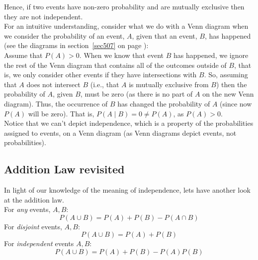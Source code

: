\noindent Hence, if two events have non-zero probability and are mutually exclusive then they are not independent. \\

\noindent For an intuitive understanding, consider what we do with a Venn diagram when we consider the probability of an event, $A$, given that an event, $B$, has happened (see the diagrams in section~\ref{sec507} on page \pageref{sec507}): \\

\noindent Assume that $P(A) > 0$. When we know that event $B$ has happened, we ignore the rest of the Venn diagram that contains all of the outcomes outside of $B$, that is, we only consider other events if they have intersections with $B$. So, assuming that $A$ does not intersect $B$ (i.e., that $A$ is mutually exclusive from $B$) then the probability of $A$, given $B$, must be zero (as there is no part of $A$ on the new Venn diagram). Thus, the occurrence of $B$ has changed the probability of $A$ (since now $P(A)$ will be zero). That is, $P(A \! \mid \! B) = 0 \neq P(A)$, as $P(A) > 0$. \\

\noindent Notice that we can't depict independence, which is a property of the probabilities assigned to events, on a Venn diagram (as Venn diagrams depict events, not probabilities).


\subsection{Addition Law revisited} \label{secadlaw}
In light of our knowledge of the meaning of independence, lets have another look at the addition law. \\

\noindent For \textit{any} events, $A,B$:
\[
P(A \cup B) = P(A) + P(B) - P(A \cap B)
\]
For \textit{disjoint} events, $A,B$:
\[
P(A \cup B) = P(A) + P(B) \tag{since $P(A \cap B) = 0$}
\]
For \textit{independent} events $A,B$:
\[
P(A \cup B) = P(A) + P(B) - P(A)P(B) \tag{since $P(A \cap B) = P(A)P(B)$}
\]


